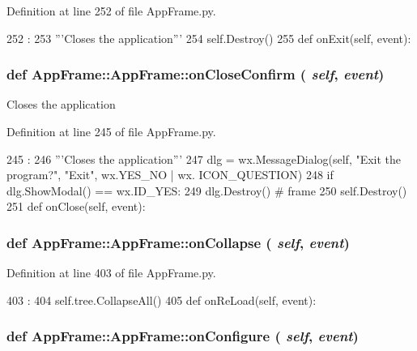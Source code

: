 Definition at line 252 of file AppFrame.py.


\begin{DoxyCode}
252                             :
253         '''Closes the application'''
254         self.Destroy()
255 
    def onExit(self, event):
\end{DoxyCode}
\hypertarget{classAppFrame_1_1AppFrame_aaa21bd6cb6d29c0ff8b86aee2b55d146}{
\subsubsection[{onCloseConfirm}]{\setlength{\rightskip}{0pt plus 5cm}def AppFrame::AppFrame::onCloseConfirm ( {\em self}, \/   {\em event})}}
\label{classAppFrame_1_1AppFrame_aaa21bd6cb6d29c0ff8b86aee2b55d146}
\begin{DoxyVerb}Closes the application\end{DoxyVerb}
 

Definition at line 245 of file AppFrame.py.


\begin{DoxyCode}
245                                    :
246         '''Closes the application'''
247         dlg = wx.MessageDialog(self, "Exit the program?", "Exit", wx.YES_NO | wx.
      ICON_QUESTION)
248         if dlg.ShowModal() == wx.ID_YES:
249             dlg.Destroy()  # frame
250         self.Destroy()
251 
    def onClose(self, event):
\end{DoxyCode}
\hypertarget{classAppFrame_1_1AppFrame_a7d96700ebc4f5a5fcf51d3d8940bcc54}{
\subsubsection[{onCollapse}]{\setlength{\rightskip}{0pt plus 5cm}def AppFrame::AppFrame::onCollapse ( {\em self}, \/   {\em event})}}
\label{classAppFrame_1_1AppFrame_a7d96700ebc4f5a5fcf51d3d8940bcc54}


Definition at line 403 of file AppFrame.py.


\begin{DoxyCode}
403                                :
404         self.tree.CollapseAll()
405         
    def onReLoad(self, event):
\end{DoxyCode}
\hypertarget{classAppFrame_1_1AppFrame_a4d4525e84c9ababf7b5c80893c803fcc}{
\subsubsection[{onConfigure}]{\setlength{\rightskip}{0pt plus 5cm}def AppFrame::AppFrame::onConfigure ( {\em self}, \/   {\em event})}}
\label{classAppFrame_1_1AppFrame_a4d4525e84c9ababf7b5c80893c803fcc}


